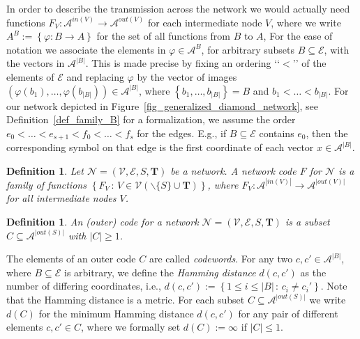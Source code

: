 \documentclass[11pt]{article}
\newcommand{\cA}{\mathcal{A}}
\newcommand{\cE}{\mathcal{E}}
\newcommand{\cN}{\mathcal{N}}
\newcommand{\cV}{\mathcal{V}}
\newtheorem{definition}[theorem]{Definition}
\begin{document}
In order to describe the transmission across the network we would actually need functions $F_V\colon \cA^{in(V)}\to\cA^{out(V)}$ for each intermediate
node $V$, where we write $A^B:=\left\{ \varphi\colon B\to A\right\}$ for the set of all functions from $B$ to $A$, For the ease of notation 
we associate the elements in $\varphi\in\cA^{B}$, for arbitrary subsets $B\subseteq \cE$, with the vectors in $\cA^{|B|}$. This is made precise by fixing an ordering 
{\lq\lq}$<${\rq\rq} of the elements of $\cE$ and replacing $\varphi$ by the vector of images $\left(\varphi(b_1),\dots,\varphi(b_{|B|})\right)\in\cA^{|B|}$, where 
$\left\{b_1,\dots,b_{|B|}\right\}=B$ and $b_1<\dots<b_{|B|}$. For our network depicted in Figure~\ref{fig_generalized_diamond_network}, see Definition~\ref{def_family_B} 
for a formalization, we assume the order $e_0<\dots<e_{s+1}<f_0<\dots<f_s$ for the edges. E.g., if $B\subseteq \cE$ contains $e_0$, then the corresponding 
symbol on that edge is the first coordinate of each vector $x\in\cA^{|B|}$. 

\begin{definition}
  Let $\cN=(\cV,\cE,S,\mathbf{T})$ be a network. A \emph{network code} $F$ for $\cN$ is a 
  family of functions $\left\{F_V\,:\, V\in \cV\left(\backslash\{S\}\cup \mathbf{T}\right)\right\}$, where 
  $F_V\colon \cA^{|in(V)|}\to\cA^{|out(V)|}$ for all intermediate nodes $V$. %
\end{definition}

\begin{definition}
  An \emph{(outer) code} for a network $\cN=(\cV,\cE,S,\mathbf{T})$ is a subset 
  $C\subseteq \cA^{|out(S)|}$ with $|C|\ge 1$. 
\end{definition}

The elements of an outer code $C$ are called \emph{codewords}. 
For any two $c,c'\in \cA^{|B|}$, where $B\subseteq \cE$ is arbitrary, we define the \emph{Hamming distance} $d(c,c')$ as 
the number of differing coordinates, i.e., $d(c,c'):=\left\{1\le i\le |B|\,:\, c_i\neq c_i'\right\}$. Note that the Hamming distance is a metric. For each subset 
$C\subseteq\cA^{|out(S)|}$ we write $d(C)$ for the minimum Hamming distance $d(c,c')$ for any pair of different elements $c,c'\in C$, where we formally set $d(C):=\infty$ if $|C|\le 1$.    
\end{document}
